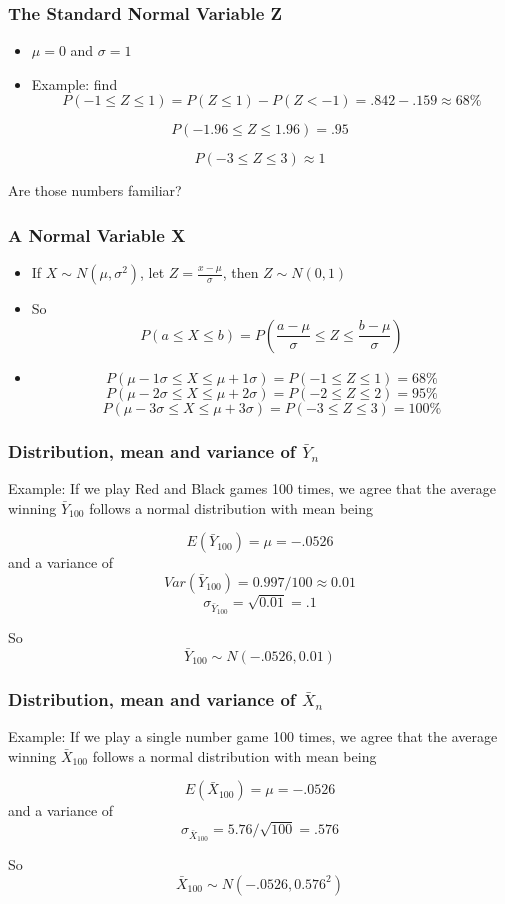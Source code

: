 \documentclass[
  ignorenonframetext,
]{beamer}
\providecommand{\tightlist}{%
  \setlength{\itemsep}{0pt}\setlength{\parskip}{0pt}}
\begin{document}
\begin{frame}
\frametitle{The Standard Normal Variable Z}

\begin{itemize}
\tightlist
\item
  \(\mu=0\) and \(\sigma=1\)
\item
  Example: find
  \[P(-1\leq Z \leq 1) = P(Z \leq 1) - P(Z < -1) = .842 - .159 \approx 68\% \]
\end{itemize}

\[P(-1.96\leq Z \leq 1.96) = .95 \]

\[P(-3 \leq Z \leq 3)  \approx 1 \]

Are those numbers familiar?
\end{frame}

\begin{frame}
\frametitle{A Normal Variable X}

\begin{itemize}
\tightlist
\item
  If \(X \sim N(\mu,\sigma^2)\), let \(Z = \frac{x - \mu}{\sigma}\),
  then \(Z \sim N(0,1)\)
\item
  So
  \[P(a \leq X \leq b) = P(\frac{a - \mu}{\sigma} \leq Z \leq \frac{b - \mu}{\sigma})\]
\item
  \[P(\mu - 1\sigma \leq X \leq \mu + 1\sigma) = P(-1 \leq Z \leq 1) = 68\%\]
  \[P(\mu - 2\sigma \leq X \leq \mu + 2\sigma) = P(-2 \leq Z \leq 2) = 95\%\]
  \[P(\mu - 3\sigma \leq X \leq \mu + 3\sigma) = P(-3 \leq Z \leq 3) = 100\%\]
\end{itemize}
\end{frame}

\begin{frame}
\frametitle{Distribution, mean and variance of $\bar{Y}_n$}

Example: If we play Red and Black games 100 times, we agree that the
average winning \(\bar{Y}_{100}\) follows a normal distribution with
mean being

\[
E(\bar{Y}_{100}) = \mu = -.0526
\] and a variance of \[
Var(\bar{Y}_{100}) = 0.997/100 \approx 0.01
\] \[
\sigma_{\bar{Y}_{100}} = \sqrt{0.01} = .1
\]

So \[
\bar{Y}_{100} \sim N(-.0526, 0.01)
\]
\end{frame}

\begin{frame}
\frametitle{Distribution, mean and variance of $\bar{X}_n$}

Example: If we play a single number game 100 times, we agree that the
average winning \(\bar{X}_{100}\) follows a normal distribution with
mean being

\[
E(\bar{X}_{100}) = \mu = -.0526
\] and a variance of \[
\sigma_{\bar{X}_{100}} = 5.76/\sqrt{100} = .576
\]

So \[
\bar{X}_{100} \sim N(-.0526, 0.576^2)
\]
\end{frame}
\end{document}

